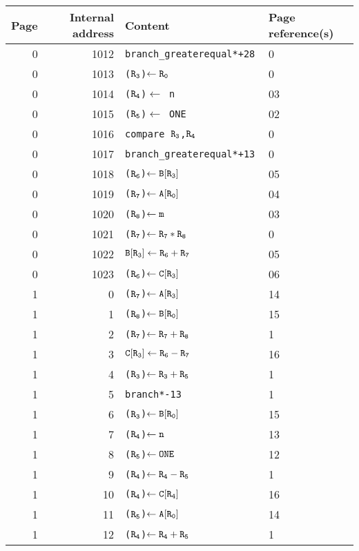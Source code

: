 \documentclass[12pt,letterpaper]{article}
\begin{document}
\begin{tabular}{r|r|l|l}
Page & Internal address & Content & Page reference(s)\\
\hline
0 & 1012 & \tt branch\_greaterequal*+28 & 0\\%
0 & 1013 & \tt ($\tt R_3$)$\tt \leftarrow R_0$ & 0\\%
0 & 1014 & \tt ($\tt R_4$)$\leftarrow$ n & 03\\%
0 & 1015 & \tt ($\tt R_5$)$\leftarrow$ ONE & 02\\%
0 & 1016 & \tt compare $\tt R_3$,$\tt R_4$ & 0\\
0 & 1017 & \tt branch\_greaterequal*+13 & 0\\%
0 & 1018 & \tt ($\tt R_6$)$\tt \leftarrow B[R_3]$ & 05\\%
0 & 1019 & \tt ($\tt R_7$)$\tt \leftarrow A[R_0]$ & 04\\%
0 & 1020 & \tt ($\tt R_8$)$\tt \leftarrow m$ & 03\\%
0 & 1021 & \tt ($\tt R_7$)$\tt \leftarrow R_7*R_8$ & 0\\%
0 & 1022 & $\tt B[R_3]\leftarrow R_6+R_7$ & 05\\%
0 & 1023 & \tt ($\tt R_6$)$\tt \leftarrow C[R_3]$ & 06\\%
1 & 0 & \tt ($\tt R_7$)$\tt \leftarrow A[R_3]$ & 14\\%
1 & 1 & \tt ($\tt R_8$)$\tt \leftarrow B[R_0]$ & 15\\%
1 & 2 & \tt ($\tt R_7$)$\tt \leftarrow R_7+R_8$ & 1\\%
1 & 3 & $\tt C[R_3] \leftarrow R_6-R_7$ & 16\\%
1 & 4 & \tt ($\tt R_3$)$\tt \leftarrow R_3+R_5$ & 1\\%
1 & 5 & \tt branch*-13 & 1\\%
1 & 6 & \tt ($\tt R_3$)$\tt \leftarrow B[R_0]$ & 15\\%
1 & 7 & \tt ($\tt R_4$)$\tt \leftarrow n$ & 13\\%
1 & 8 & \tt ($\tt R_5$)$\tt \leftarrow ONE$ & 12\\%
1 & 9 & \tt ($\tt R_4$)$\tt \leftarrow R_4-R_5$ & 1\\%
1 & 10 & \tt ($\tt R_4$)$\tt \leftarrow C[R_4]$ & 16\\%
1 & 11 & \tt ($\tt R_5$)$\tt \leftarrow A[R_0]$ & 14\\%
1 & 12 & \tt ($\tt R_4$)$\tt \leftarrow R_4+R_5$ & 1\\%

\end{tabular}
\end{document}
